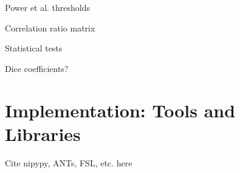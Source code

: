 Power et al. thresholds

Correlation ratio matrix

Statistical tests

Dice coefficients?

\section{Implementation: Tools and Libraries}


Cite nipypy, ANTs, FSL, etc. here

